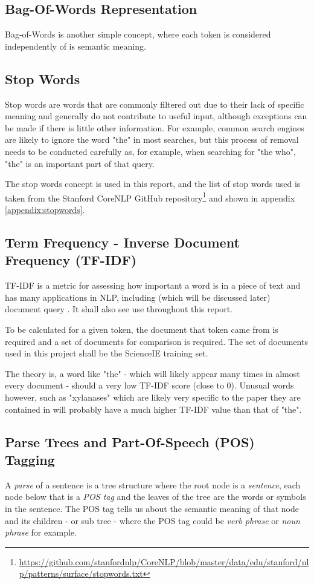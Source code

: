 \subsection*{Bag-Of-Words Representation}
Bag-of-Words is another simple concept, where each token is considered independently of is semantic meaning. 

\subsection*{Stop Words}
Stop words are words that are commonly filtered out due to their lack of specific meaning and generally do not contribute to useful input, although exceptions can be made if there is little other information. For example, common search engines are likely to ignore the word "the" in most searches, but this process of removal needs to be conducted carefully as, for example, when searching for "the who", "the" is an important part of that query. 

The stop words concept is used in this report, and the list of stop words used is taken from the Stanford CoreNLP GitHub repository\footnote{\href{https://github.com/stanfordnlp/CoreNLP/blob/master/data/edu/stanford/nlp/patterns/surface/stopwords.txt}{https://github.com/stanfordnlp/CoreNLP/blob/master/data/edu/stanford/nlp/patterns/surface/stopwords.txt}} and shown in appendix \ref{appendix:stopwords}.

\subsection*{Term Frequency - Inverse Document Frequency (TF-IDF)}
TF-IDF is a metric for assessing how important a word is in a piece of text and has many applications in NLP, including (which will be discussed later) document query \cite{Ramos2003}. It shall also see use throughout this report.

To be calculated for a given token, the document that token came from is required and a set of documents for comparison is required. The set of documents used in this project shall be the ScienceIE training set.

The theory is, a word like "the" - which will likely appear many times in almost every document - should a very low TF-IDF score (close to 0). Unusual words however, such as "xylanases" which are likely very specific to the paper they are contained in will probably have a much higher TF-IDF value than that of "the".

\subsection*{Parse Trees and Part-Of-Speech (POS) Tagging}
A \textit{parse} of a sentence is a tree structure where the root node is a \textit{sentence}, each node below that is a \textit{POS tag} and the leaves of the tree are the words or symbols in the sentence. The POS tag tells us about the semantic meaning of that node and its children - or sub tree - where the POS tag could be \textit{verb phrase} or \textit{noun phrase} for example.

